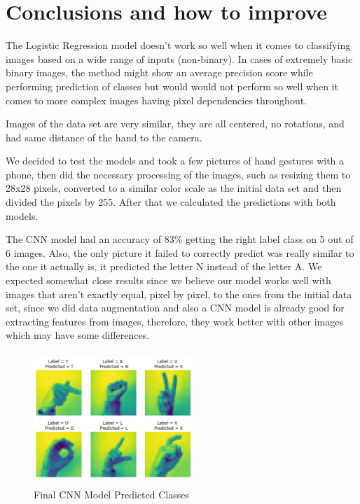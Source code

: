\documentclass[conference]{IEEEtran}
\begin{document}
\section{Conclusions and how to improve}

The Logistic Regression model doesn't work so well when it comes to classifying images based on a wide range of inputs (non-binary).
In cases of extremely basic binary images, the method might show an average precision score while performing prediction of classes but would would not perform so well when it comes to more complex images having pixel dependencies throughout.\cite{towardsdatascience_Saha}

Images of the data set are very similar, they are all centered, no rotations, and had same distance of the hand to the camera.

We decided to test the models and took a few pictures of hand gestures with a phone, then did the necessary processing of the images, such as resizing them to 28x28 pixels, converted to a similar color scale as the initial data set and then divided the pixels by 255. After that we calculated the predictions with both models.

The CNN model had an accuracy of 83\% getting the right label class on 5 out of 6 images. Also, the only picture it failed to correctly predict was really similar to the one it actually is, it predicted the letter N instead of the letter A. We expected somewhat close results since we believe our model works well with images that aren't exactly equal, pixel by pixel, to the ones from the initial data set, since we did data augmentation and also a CNN model is already good for extracting features from images, therefore, they work better with other images which may have some differences.

\begin{figure}[htbp]
    \centerline{\includegraphics[width=6cm,height=5cm]{img/cnn_prediction_test.png}}
    \caption{Final CNN Model Predicted Classes}
    \label{fig:hist_train_classes}
\end{figure}
\end{document}

